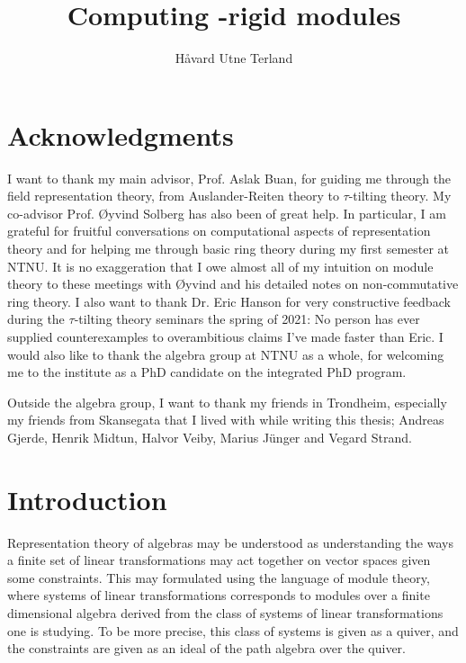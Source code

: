 \documentclass[]{article}
\title{Computing \tu-rigid modules}
\author{Håvard Utne Terland}
\theoremstyle{definition}
\begin{document}
\maketitle

\begin{abstract}

\end{abstract}

\newpage
\section*{Acknowledgments}
I want to thank my main advisor, Prof. Aslak Buan, for guiding me through the field representation theory, from Auslander-Reiten theory to $\tau$-tilting theory. My co-advisor Prof. Øyvind Solberg has also been of great help. In particular, I am grateful for fruitful conversations on computational aspects of representation theory and for helping me through basic ring theory during my first semester at NTNU. It is no exaggeration that I owe almost all of my intuition on module theory to these meetings with Øyvind and his detailed notes on non-commutative ring theory.
I also want to thank Dr. Eric Hanson for very constructive feedback during the $\tau$-tilting theory seminars the spring of 2021: No person has ever supplied counterexamples to overambitious claims I've made faster than Eric. I would also like to thank the algebra group at NTNU as a whole, for welcoming me to the institute as a PhD candidate on the integrated PhD program.

Outside the algebra group, I want to thank my friends in Trondheim, especially my friends from Skansegata that I lived with while writing this thesis; Andreas Gjerde, Henrik Midtun, Halvor Veiby, Marius Jünger and Vegard Strand. 



\newpage
\section{Introduction}
Representation theory of algebras may be understood as understanding the ways a finite set of linear transformations may act together on vector spaces given some constraints. This may formulated using the language of module theory, where systems of linear transformations corresponds to modules over a finite dimensional algebra derived from the class of systems of linear transformations one is studying. To be more precise, this class of systems is given as a quiver, and the constraints are given as an ideal of the path algebra over the quiver.
\end{document}
